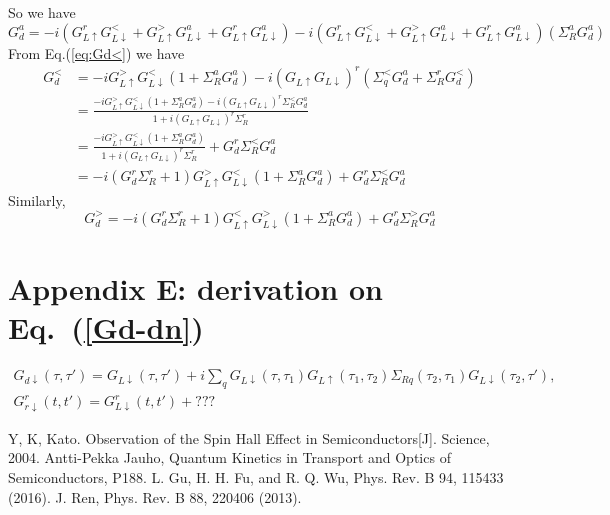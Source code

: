 \documentclass[aps,prb,superscriptaddress]{revtex4-2}
\begin{document}
So we have
\begin{equation}
G_{d}^{a} = -i(G_{L \uparrow}^{r} G_{L \downarrow}^{<}+G_{L \uparrow}^{>} G_{L \downarrow}^{a}+G_{L \uparrow}^{r} G_{L \downarrow}
^{a})-i(G_{L \uparrow}^{r} G_{L \downarrow}^{<}+G_{L \uparrow}^{>} G_{L \downarrow}^{a}+G_{L \uparrow}^{r} G_{L \downarrow}^{a})(\Sigma_{R}^{a} G_{d}^{a})
\end{equation}
From Eq.(\ref{eq:Gd<}) we have
\begin{equation}
\begin{split}
G_{d}^{<}&=-i G_{L \uparrow}^{>} G_{L \downarrow}^{<}\left(1+\Sigma_{R}^{a} G_{d}^{a}\right)-i\left(G_{L \uparrow} G_{L \downarrow}\right)^{r}\left(\Sigma_{q}^{<} G_{d}^{a}+\Sigma_{R}^{r} G_{d}^{<}\right)\\
&=\frac{-i G_{L \uparrow}^{>} G_{L \downarrow}^{<}\left(1+\Sigma_{R}^{a} G_{d}^{a}\right) - i\left(G_{L \uparrow} G_{L \downarrow}\right)^{r}\Sigma_{R}^{<} G_{d}^{a}}{1+i\left(G_{L \uparrow} G_{L \downarrow}\right)^{r}\Sigma_{R}^{r}} \\
&=\frac{-i G_{L \uparrow}^{>} G_{L \downarrow}^{<}\left(1+\Sigma_{R}^{a} G_{d}^{a}\right)}{1+i\left(G_{L \uparrow} G_{L \downarrow}\right)^{r}\Sigma_{R}^{r}} + G_{d}^{r}\Sigma_{R}^{<} G_{d}^{a}\\
&=-i(G_{d}^{r}\Sigma_{R}^{r}+1) G_{L \uparrow}^{>} G_{L \downarrow}^{<}\left(1+\Sigma_{R}^{a} G_{d}^{a}\right) + G_{d}^{r}\Sigma_{R}^{<} G_{d}^{a}
\end{split}
\end{equation}
Similarly,
\begin{equation}
G_{d}^{>}=-i\left(G_{d}^{r} \Sigma_{R}^{r}+1\right) G_{L \uparrow}^{<} G_{L \downarrow}^{>}\left(1+\Sigma_{R}^{a} G_{d}^{a}\right)+G_{d}^{r} \Sigma_{R}^{>} G_{d}^{a}
\end{equation}

\section*{Appendix E: derivation on Eq.~(\ref{Gd-dn})}
\begin{eqnarray}
G_{d\downarrow}(\tau,\tau') =G_{L\downarrow}(\tau,\tau') + i\sum_q G_{L\downarrow}(\tau,\tau_1)  G_{L\uparrow}(\tau_1,\tau_2)\Sigma_{Rq}(\tau_2,\tau_1) G_{L\downarrow}(\tau_2,\tau'),\\
G_{r\downarrow}^r(t,t') =G_{L\downarrow}^r(t,t') + ???
\end{eqnarray}








\begin{thebibliography}{10}
Y, K, Kato. Observation of the Spin Hall Effect in Semiconductors[J]. Science, 2004.
Antti-Pekka Jauho, Quantum Kinetics in Transport and Optics of Semiconductors, P188.
 L. Gu, H. H. Fu, and R. Q. Wu, Phys. Rev. B 94, 115433 (2016).
 J. Ren, Phys. Rev. B 88, 220406 (2013).
\end{thebibliography}


\end{document}

